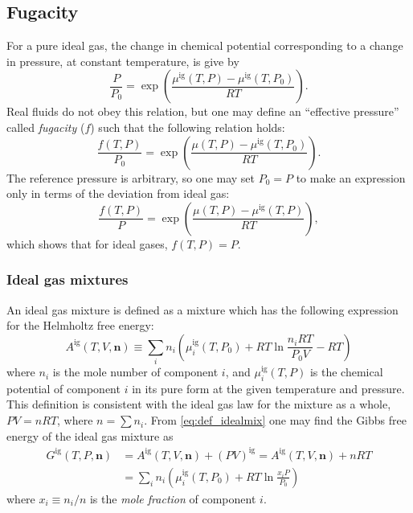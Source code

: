 \documentclass[internal,english]{sintefmemo2012}
\newcommand*{\vektor}[1]{\boldsymbol{#1}}%
\begin{document}
\subsection{Fugacity}
For a pure ideal gas, the change in chemical potential corresponding to a change in pressure, at constant temperature, is give by 
\begin{equation}
  \frac{P}{P_0} = \exp\left( \frac{\mu^\text{ig}(T,P) - \mu^\text{ig}(T,P_0) }{RT} \right).
  \label{}
\end{equation}
Real fluids do not obey this relation, but one may define an ``effective pressure'' called 
\textit{fugacity} ($f$) such that the following relation holds:
\begin{equation}
  \frac{f(T,P)}{P_0} = \exp\left( \frac{\mu(T,P) - \mu^\text{ig}(T,P_0) }{RT} \right).
  \label{}
\end{equation}
The reference pressure is arbitrary, so one may set $P_0=P$ to make an expression only in terms of the deviation from ideal gas:
\begin{equation}
  \frac{f(T,P)}{P} = \exp\left( \frac{\mu(T,P) - \mu^\text{ig}(T,P) }{RT} \right),
  \label{}
\end{equation}
which shows that for ideal gases, $f(T,P)=P$.



\subsubsection{Ideal gas mixtures}
An ideal gas mixture is defined as a mixture which has the following expression for the Helmholtz free energy:
\begin{equation}
  A^\text{ig}(T,V,\vektor{n}) \equiv \sum_i n_i \left( 
  \mu_i^\text{ig}(T,P_0) + RT\ln \frac{n_i RT}{P_0 V} - RT
  \right)
  \label{eq:def_idealmix}
\end{equation}
where $n_i$ is the mole number of component $i$, and
$\mu^\text{ig}_i(T,P)$ is the chemical potential of component $i$ in its pure form 
at the given temperature and pressure. This definition is consistent with the ideal gas law for the mixture as a whole, 
$PV=nRT$, where $n=\sum n_i$.
From \eqref{eq:def_idealmix} one may find the Gibbs free energy of the 
ideal gas mixture as
\begin{align}
  G^\text{ig}(T,P,\vektor{n}) 
  &= A^\text{ig}(T,V,\vektor{n}) + \left( PV \right)^\text{ig} = A^\text{ig}(T,V,\vektor{n}) + nRT \nonumber\\
  &= \sum_i n_i \left( 
  \mu_i^\text{ig}(T,P_0) + RT\ln \frac{x_i P}{P_0}
  \right)
  \label{eq:G_idealmix}
\end{align}
where $x_i \equiv n_i/n$ is the \textit{mole fraction} of component $i$.
\end{document}
